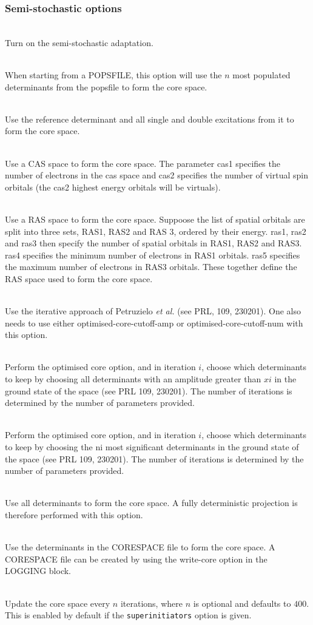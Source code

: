 \documentclass[a4paper,notitlepage,dvipsnames]{scrreprt}
\newcommand\codeitem[1]{\needspace{1.5\baselineskip}\item[\textnormal{\ttfamily #1 \nopagebreak}] \hfill \\ \nopagebreak}
\begin{document}
  \subsubsection{Semi-stochastic options}
  \begin{description}
    \codeitem{\textcolor{oblue}{semi-stochastic}}
    Turn on the semi-stochastic adaptation.
    \codeitem{\textcolor{oblue}{pops-core $n$}}
    When starting from a POPSFILE, this option will use the $n$ most
    populated determinants from the popsfile to form the core space.
    \codeitem{doubles-core}
    Use the reference determinant and all single and double excitations
    from it to form the core space.
    \codeitem{cas-core cas1 cas2}
    Use a CAS space to form the core space. The parameter cas1 specifies
    the number of electrons in the cas space and cas2 specifies the
    number of virtual spin orbitals (the cas2 highest energy orbitals
    will be virtuals).
    \codeitem{ras-core ras1 ras2 ras3 ras4 ras5}
    Use a RAS space to form the core space. Suppoose the list of spatial
    orbitals are split into three sets, RAS1, RAS2 and RAS 3, ordered
    by their energy. ras1, ras2 and ras3 then specify the number of
    spatial orbitals in RAS1, RAS2 and RAS3. ras4 specifies the minimum
    number of electrons in RAS1 orbitals. ras5 specifies the maximum
    number of electrons in RAS3 orbitals. These together define the RAS
    space used to form the core space.
    \codeitem{optimised-core}
    Use the iterative approach of Petruzielo \emph{et al.} (see PRL,
    109, 230201). One also needs to use either optimised-core-cutoff-amp
    or optimised-core-cutoff-num with this option.
    \codeitem{optimised-core-cutoff-amp $x1$, $x2$, $x3$...}
    Perform the optimised core option, and in iteration $i$, choose
    which determinants to keep by choosing all determinants with an
    amplitude greater than $xi$ in the ground state of the space (see
    PRL 109, 230201). The number of iterations is determined by the
    number of parameters provided.
    \codeitem{optimised-core-cutoff-num $n1$, $n2$, $n3$...}
    Perform the optimised core option, and in iteration $i$, choose
    which determinants to keep by choosing the ni most significant
    determinants in the ground state of the space (see PRL 109, 230201).
    The number of iterations is determined by the number of parameters
    provided.
    \codeitem{fci-core}
    Use all determinants to form the core space. A fully deterministic
    projection is therefore performed with this option.
    \codeitem{read-core}
    Use the determinants in the CORESPACE file to form the core space.
    A CORESPACE file can be created by using the write-core option in
    the LOGGING block.
    \codeitem{dynamic-core $n$}
    Update the core space every $n$ iterations, where $n$ is optional and
    defaults to $400$. This is enabled by default if the
    \texttt{superinitiators} option is given.
    \end{description}
\end{document}
